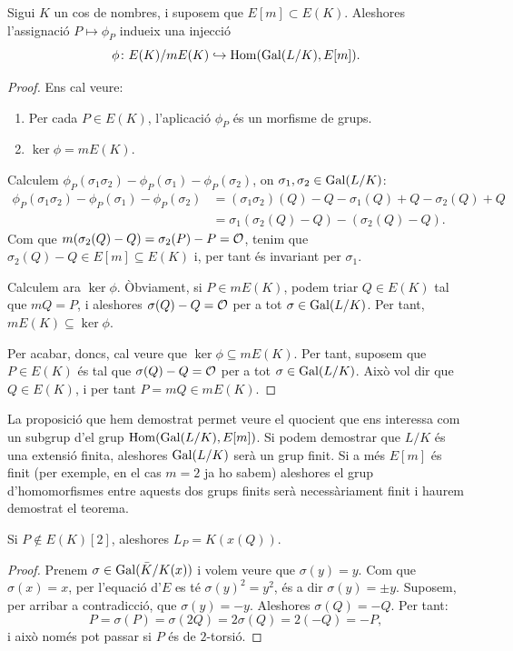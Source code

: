 \begin{proposition}
Sigui $K$ un cos de nombres, i suposem que $E[m] \subset E(K)$. Aleshores l'assignació $P\mapsto \phi_P$ indueix una injecció
\[
\phi\colon E(K)/mE(K)\hookrightarrow \operatorname{Hom}(\operatorname{Gal}(L/K), E[m]).
\]
\end{proposition}
\begin{proof}
Ens cal veure:
\begin{enumerate}
    \item Per cada $P\in E(K)$, l'aplicació $\phi_P$ és un morfisme de grups.
    \item $\ker \phi=mE(K)$.
\end{enumerate}
Calculem $\phi_P(\sigma_1\sigma_2)-\phi_P(\sigma_1)-\phi_P(\sigma_2)$, on $\sigma_1,\sigma_2\in\operatorname{Gal}(L/K)$:
\begin{align*}
\phi_P(\sigma_1\sigma_2)-\phi_P(\sigma_1)-\phi_P(\sigma_2)&=(\sigma_1\sigma_2)(Q)-Q - \sigma_1(Q)+Q-\sigma_2(Q)+Q\\
&=\sigma_1(\sigma_2(Q)-Q) - (\sigma_2(Q)-Q).
\end{align*}
Com que $m(\sigma_2(Q)-Q) = \sigma_2(P)-P = \mathcal{O}$,
tenim que $\sigma_2(Q)-Q\in E[m]\subseteq E(K)$ i, per tant és invariant per $\sigma_1$.

Calculem ara $\ker\phi$. Òbviament, si $P\in mE(K)$, podem triar $Q\in E(K)$ tal que $mQ=P$, i aleshores $\sigma(Q)-Q=\mathcal{O}$ per a tot $\sigma\in \operatorname{Gal}(L/K)$. Per tant, $mE(K)\subseteq \ker\phi$.

Per acabar, doncs, cal veure que $\ker\phi\subseteq mE(K)$. Per tant, suposem que $P\in E(K)$ és tal que $\sigma(Q)-Q=\mathcal{O}$ per a tot $\sigma\in \operatorname{Gal}(L/K)$. Això vol dir que $Q\in E(K)$, i per tant $P=mQ\in mE(K)$.
\end{proof}

La proposició que hem demostrat permet veure el quocient que ens interessa com un subgrup d'el grup $\operatorname{Hom}(\operatorname{Gal}(L/K),E[m])$. Si podem demostrar que $L/K$ és una extensió finita, aleshores $\operatorname{Gal}(L/K)$ serà un grup finit. Si a més $E[m]$ és finit (per exemple, en el cas $m=2$ ja ho sabem) aleshores el grup d'homomorfismes entre aquests dos grups finits serà necessàriament finit i haurem demostrat el teorema.

\begin{lemma}
Si $P\not\in E(K)[2]$, aleshores $L_P=K(x(Q))$.
\end{lemma}
\begin{proof}
Prenem $\sigma\in \operatorname{Gal}(\bar K/K(x))$ i volem veure que $\sigma(y)=y$. Com que $\sigma(x)=x$, per l'equació d'$E$ es té $\sigma(y)^2=y^2$, és a dir $\sigma(y)=\pm y$. Suposem, per arribar a contradicció, que $\sigma(y)=-y$. Aleshores $\sigma(Q)=-Q$. Per tant:
\[
P = \sigma(P) = \sigma(2Q)= 2\sigma(Q)=2(-Q) = -P,
\]
i això només pot passar si $P$ és de $2$-torsió.
\end{proof}

